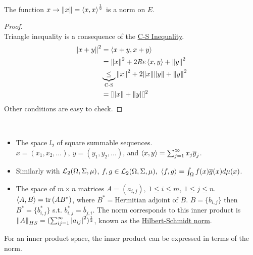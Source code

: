\begin{corollary}\ \\
The function $x \to \norm{x} = \left\langle x, x \right\rangle^{\frac{1}{2}}$ is a norm on $E$.
\end{corollary}
\begin{proof}\ \\
Triangle inequality is a consequence of the \underline{C-S Inequality}. 
\begin{align*}
    \norm{x + y}^2 &= \left\langle x+y, x+y \right\rangle\\ &= \norm{x}^2 + 2 Re\left\langle x, y \right\rangle + \norm{y}^2\\ &\underbrace{\leq}_{\text{C-S}} \norm{x}^2 + 2 \norm{x} \norm{y} + \norm{y}^2\\ &= [\norm{x} + \norm{y}]^2
\end{align*}
Other conditions are easy to check.
\end{proof}

\begin{examples}\ 
\begin{itemize}
    \item The space $\mathit{l}_2$ of square summable sequences. $x = (x_1,x_2,\dots),\ y = (y_1,y_2,\dots)$, and $\left\langle x, y \right\rangle = \sum_{j = 1}^\infty x_j \overline{y}_j$.
    \item Similarly with $\mathcal{L}_2(\Omega,\Sigma,\mu)$, $f,g \in \mathcal{L}_2(\Omega, \Sigma, \mu),\ \left\langle f, g \right\rangle = \int_\Omega f(x )\overline{g}(x) d\mu(x)$.
    \item The space of $m \times n$ matrices $A = (a_{i,j}),\ 1 \leq i \leq m,\ 1 \leq j \leq n$. $\inprod{A}{B} = \trace{(A B^*)}$, where $B^* = \text{Hermitian adjoint of } B$. $B = \{b_{i,j}\}$ then $B^* = \{b_{i,j}^*\}$ s.t. $b_{i,j}^* = \overline{b}_{j,i}$. The norm corresponds to this inner product is $\norm{A}_{HS} = (\sum_{ij = 1}^\infty \abs{a_{ij}}^2)^{\frac{1}{2}}$, known as the \underline{Hilbert-Schmidt norm}.
\end{itemize}
\end{examples}

\np For an inner product space, the inner product can be expressed in terms of the norm.


